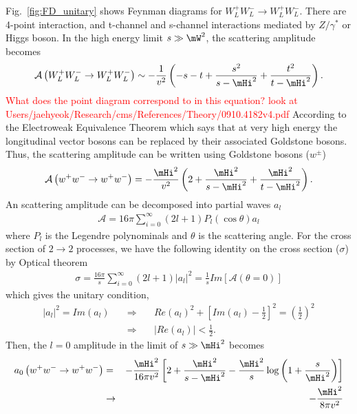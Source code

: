 Fig.~\ref{fig:FD_unitary} shows Feynman diagrams for $W_L^+W_L^- \to W_L^+W_L^-$. 
There are 4-point interaction, and t-channel and s-channel interactions mediated 
by $Z/\gamma^*$ or Higgs boson.
In the high energy limit $s \gg \mW^2$, the scattering amplitude becomes \cite{Djouadi20081} 
\begin{eqnarray} 
\label{eq:WWscat}
\mathcal{A}\left( W_L^+W_L^- \to W_L^+W_L^- \right) 
\sim 
- \frac{1}{v^2}  \left( -s - t + \frac{s^2}{s - \mHi^2} + \frac{t^2}{t - \mHi^2} \right). 
\end{eqnarray} 
\textcolor{red}{What does the point diagram correspond to in this equation?
look at Users/jaehyeok/Research/cms/References/Theory/0910.4182v4.pdf}  
According to the Electroweak Equivalence Theorem \cite{31-33} which says 
that at very high energy the longitudinal vector bosons can be replaced by 
their associated Goldstone bosons. Thus, the scattering amplitude can be written 
using Goldstone bosons ($w^\pm$)
\begin{eqnarray} 
\mathcal{A}\left( w^+w^- \to w^+w^- \right) 
= 
- \frac{\mHi^2}{v^2}  \left( 2 + \frac{\mHi^2}{s - \mHi^2} + \frac{\mHi^2}{t - \mHi^2} \right). 
\end{eqnarray} 
An scattering amplitude can be decomposed into partial waves $a_l$
\begin{eqnarray} 
\mathcal{A} = 16 \pi \sum_{i=0}^\infty 
              \left( 2l+1 \right) P_l \left( \cos \theta \right) a_l
\end{eqnarray} 
where $P_l$ is the Legendre polynominals and $\theta$ is the scattering angle.
For the cross section of $2 \to 2$ processes, we have the 
following identity on the cross section ($\sigma$) by Optical theorem \cite{optical}
\begin{eqnarray} 
\sigma 
= \frac{16 \pi}{s} \sum_{i=0}^\infty  \left( 2l+1 \right) \left| a_l \right|^2 
= \frac{1}{s} Im \left[ \mathcal{A} \left(\theta = 0 \right)  \right]
\end{eqnarray} 
which gives the unitary condition, 
\begin{eqnarray} 
\left| a_l \right|^2 = Im \left( a_l \right) 
\quad &\Rightarrow& \quad  
Re\left( a_l \right)^2 
+ \left[ Im\left( a_l \right)  - \frac{1}{2} \right]^2 
= \left( \frac{1}{2} \right)^2 \\
\label{eq:unitaryWW}
\quad &\Rightarrow& \quad 
\left| Re \left( a_l \right) \right| < \frac{1}{2}.   
\end{eqnarray} 
Then, the $l=0$ amplitude in the limit of $ s \gg \mHi^2$ becomes  
\begin{eqnarray} 
a_0\left( w^+w^- \to w^+w^- \right)  
&=&  
- \frac{\mHi^2}{16\pi v^2}  
\left[ 2 + \frac{\mHi^2}{s - \mHi^2} 
       - \frac{\mHi^2}{s} \log \left( 1 + \frac{s}{\mHi^2} \right) \right]  \\
&\rightarrow&
- \frac{\mHi^2}{8\pi v^2} 
\end{eqnarray} 
